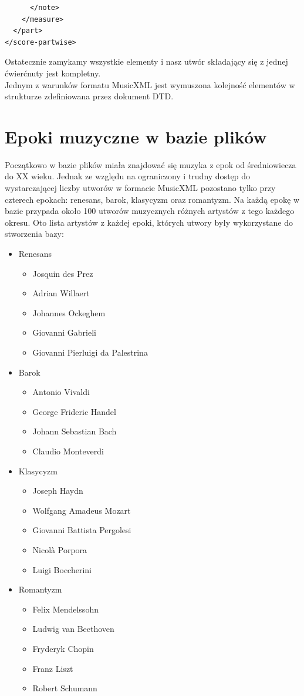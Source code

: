 \documentclass[printmode, eng, openany]{mgr}
\newcommand\tab[1][1cm]{\hspace*{#1}}
\begin{document}
\begin{lstlisting}
      </note>
    </measure>
  </part>
</score-partwise>
\end{lstlisting}
Ostatecznie zamykamy wszystkie elementy i nasz utwór składający się z jednej ćwierćnuty jest kompletny.\\

\tab Jednym z warunków formatu MusicXML jest wymuszona kolejność elementów w strukturze zdefiniowana przez dokument DTD.
\section{Epoki muzyczne w bazie plików}
\tab Początkowo w bazie plików miała znajdować się muzyka z epok od średniowiecza do XX wieku. Jednak ze względu na ograniczony i trudny dostęp do wystarczającej liczby utworów w formacie MusicXML pozostano tylko przy czterech epokach: renesans, barok, klasycyzm oraz romantyzm. Na każdą epokę w bazie przypada około 100 utworów muzycznych różnych artystów z tego każdego okresu. Oto lista artystów z każdej epoki, których utwory były wykorzystane do stworzenia bazy:
\begin{itemize}
\item Renesans
\begin{itemize}
\item Josquin des Prez
\item Adrian Willaert
\item Johannes Ockeghem
\item Giovanni Gabrieli
\item Giovanni Pierluigi da Palestrina
\end{itemize}
\item Barok
\begin{itemize}
\item Antonio Vivaldi
\item George Frideric Handel
\item Johann Sebastian Bach
\item Claudio Monteverdi
\end{itemize}
\item Klasycyzm
\begin{itemize}
\item Joseph Haydn
\item Wolfgang Amadeus Mozart
\item Giovanni Battista Pergolesi
\item Nicolà Porpora
\item Luigi Boccherini
\end{itemize}
\item Romantyzm
\begin{itemize}
\item Felix Mendelssohn
\item Ludwig van Beethoven
\item Fryderyk Chopin
\item Franz Liszt
\item Robert Schumann
\end{itemize}
\end{itemize}
\end{document}
